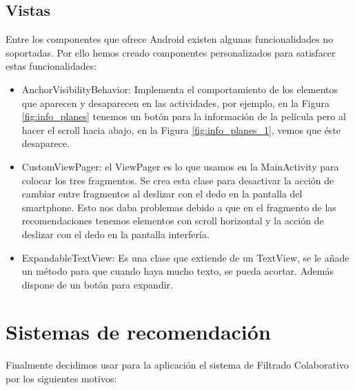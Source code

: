 \subsection{Vistas}
\label{makereference4.4.7}
Entre los componentes que ofrece Android existen algunas funcionalidades no soportadas. Por ello hemos creado componentes personalizados para satisfacer estas funcionalidades:
\begin{itemize}
    \item AnchorVisibilityBehavior: Implementa el comportamiento de los elementos que aparecen y desaparecen en las actividades, por ejemplo, en la Figura \ref{fig:info_planes} tenemos un botón para la información de la película pero al hacer el scroll hacia abajo, en la Figura \ref{fig:info_planes_1}, vemos que éste desaparece.
    \item CustomViewPager: el ViewPager es lo que usamos en la MainActivity para colocar los tres fragmentos. Se crea esta clase para desactivar la acción de cambiar entre fragmentos al deslizar con el dedo en la pantalla del smartphone. Esto nos daba problemas debido a que en el fragmento de las recomendaciones tenemos elementos con scroll horizontal y la acción de deslizar con el dedo en la pantalla interfería.
    \item ExpandableTextView: Es una clase que extiende de un TextView, se le añade un método para que cuando haya mucho texto, se pueda acortar. Además dispone de un botón para expandir.
\end{itemize} 
\section{Sistemas de recomendación}
\label{makereference4.5}
Finalmente decidimos usar para la aplicación el sistema de Filtrado Colaborativo por los siguientes motivos:

